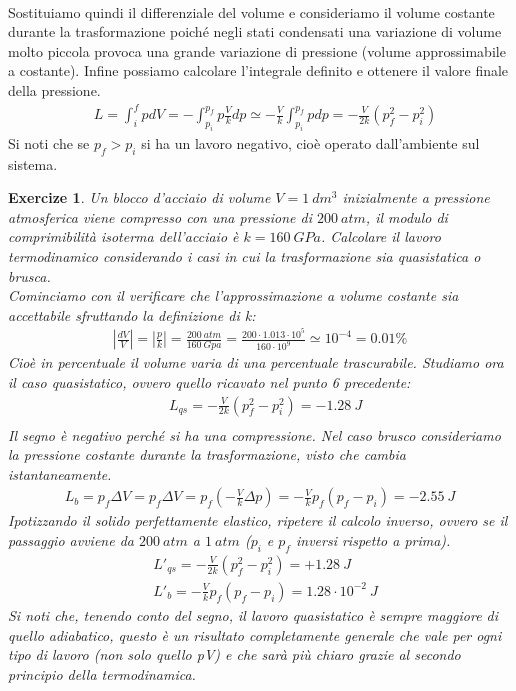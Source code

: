 \documentclass[10pt,a4paper]{article}
\newtheorem{exercize}{Exercize}
\begin{document}
\begin{enumerate}
\begin{align*}
	\end{align*} 
Sostituiamo quindi il differenziale del volume e consideriamo il volume costante durante la trasformazione poiché negli stati condensati una variazione di volume molto piccola provoca una grande variazione di pressione (volume approssimabile a costante). Infine possiamo calcolare l'integrale definito e ottenere il valore finale della pressione. 
\begin{align*}
	&L=\int_{i}^{f}pdV = -\int_{p_i}^{p_f}p\frac{V}{k}dp \simeq -\frac{V}{k}\int_{p_i}^{p_f}pdp = -\frac{V}{2k}\left(p_f^2-p_i^2\right)
\end{align*}
Si noti che se $p_f > p_i$ si ha un lavoro negativo, cioè operato dall'ambiente sul sistema. 
\end{enumerate}
\begin{exercize}
	Un blocco d'acciaio di volume $V = 1\ dm^3$ inizialmente a pressione atmosferica viene compresso con una pressione di $200\ atm$, il modulo di comprimibilità isoterma dell'acciaio è $k = 160\ GPa$. Calcolare il lavoro termodinamico considerando i casi in cui la trasformazione sia quasistatica o brusca.\\
	Cominciamo con il verificare che l'approssimazione a volume costante sia accettabile sfruttando la definizione di k:
	\begin{align*}
		|\frac{dV}{V}|=|\frac{p}{k}|=\frac{200\ atm}{160\ Gpa}=\frac{200\cdot 1.013\cdot 10^5}{160\cdot 10^9} \simeq 10^{-4} = 0.01 \%
	\end{align*}
	Cioè in percentuale il volume varia di una percentuale trascurabile. Studiamo ora il caso quasistatico, ovvero quello ricavato nel punto 6 precedente:
	\begin{align*}
		&L_{qs} = -\frac{V}{2k}\left(p_f^2-p_i^2\right) = -1.28\ J\\	
	\end{align*}
	Il segno è negativo perché si ha una compressione. Nel caso brusco consideriamo la pressione costante durante la trasformazione, visto che cambia istantaneamente.
	\begin{align*}
	L_b = p_f\Delta V = p_f\Delta V = p_f\left(-\frac{V}{k}\Delta p \right)=-\frac{V}{k} p_f(p_f - p_i) = -2.55\ J
	\end{align*}
	Ipotizzando il solido perfettamente elastico, ripetere il calcolo inverso, ovvero se il passaggio avviene da $200\ atm$ a $1\ atm$ ($p_i$ e $p_f$ inversi rispetto a prima).
	\begin{align*}
		&L'_{qs} = -\frac{V}{2k}\left(p_f^2-p_i^2\right) = +1.28\ J\\
		&L'_b = -\frac{V}{k} p_f(p_f - p_i) = 1.28 \cdot 10^{-2}\ J
	\end{align*}
	Si noti che, tenendo conto del segno, il lavoro quasistatico è sempre maggiore di quello adiabatico, questo è un risultato completamente generale che vale per ogni tipo di lavoro (non solo quello pV) e che sarà più chiaro grazie al secondo principio della termodinamica.
\end{exercize}
\end{document}
